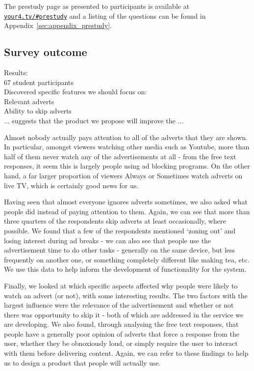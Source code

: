 The prestudy page as presented to participants is available at \href{http://your4.tv/\#prestudy}{\texttt{your4.tv/\#prestudy}} and a listing of the questions can be found in Appendix~\ref{sec:appendix_prestudy}. %


\subsection{Survey outcome}

Results:\\
67 student participants\\
Discovered specific features we should focus on:\\
Relevant adverts\\
Ability to skip adverts\\
... suggests that the product we propose will improve the ...

Almost nobody actually pays attention to all of the adverts that they are shown. In particular, amongst viewers watching other media such as Youtube, more than half of them never watch any of the advertisements at all - from the free text responses, it seem this is largely people using ad blocking programs. On the other hand, a far larger proportion of viewers Always or Sometimes watch adverts on live TV, which is certainly good news for us.

Having seen that almost everyone ignores adverts sometimes, we also asked what people did instead of paying attention to them. Again, we can see that more than three quarters of the respondents skip adverts at least occasionally, where possible. We found that a few of the respondents mentioned `zoning out' and losing interest during ad breaks - we can also see that people use the advertisement time to do other tasks - generally on the same device, but less frequently on another one, or something completely different like making tea, etc. We use this data to help inform the development of functionality for the system.

Finally, we looked at which specific aspects affected why people were likely to watch an advert (or not), with some interesting results. The two factors with the largest influence were the relevance of the advertisement and whether or not there was opportunity to skip it - both of which are addressed in the service we are developing. We also found, through analysing the free text responses, that people have a generally poor opinion of adverts that force a response from the user, whether they be obnoxiously loud, or simply require the user to interact with them before delivering content. Again, we can refer to these findings to help us to design a product that people will actually use. 

